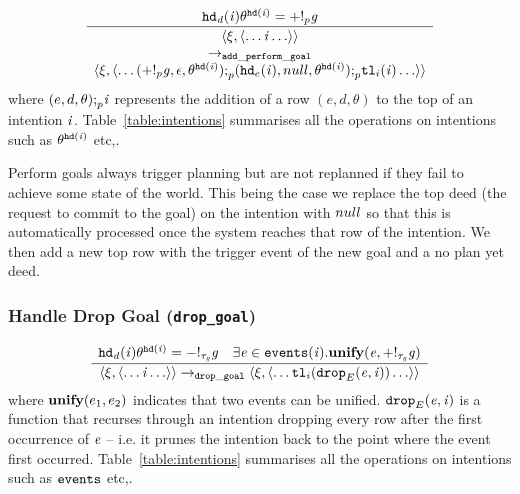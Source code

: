 \begin{equation}\index{goal!perform}
\frac{\INThddeed(\AILintention)\INThdunifier{\AILintention} = +!_{p}\AILgoal
}{
  \begin{array}{c}
\langle \xi, \langle \ldots  \AILintention \ldots \rangle \rangle \\ \rightarrow_{\tt add\_perform\_goal} \\
\langle \xi, \langle \ldots (+!_{p}\AILgoal, \AILnpy, \INThdunifier{\AILintention}) \INTcons (\INThdevent(\AILintention), \AILnullaction,
\INThdunifier{\AILintention}) \INTcons \INTtl(\AILintention) \ldots \rangle \rangle
\end{array}
}
\end{equation}
where $(e, d, \theta) {\tt ;}_p \mathit{i}$ represents the addition of a row $(e, d, \theta)$ to the top of an intention $\mathit{i}$.  Table~\ref{table:intentions} summarises all the operations on intentions such as $\theta^{{\tt hd}(\mathit{i})}$ etc,.

Perform goals always trigger planning but are not replanned if they fail to achieve some state of the world.  This being the case we replace the top deed (the request to commit to the goal) on the intention with $null$ so that this is automatically processed once the system reaches that row of the intention.  We then add a new top row with the trigger event of the new goal and a no plan yet deed.

\subsubsection*{Handle Drop Goal ({\tt drop\_goal})}

\begin{equation}
\frac{
\begin{array}{c}
\mathit{{\tt hd}_d}(\mathit{i})\theta^{{\tt hd}(\mathit{i})} = \mathit{-!}_{\mathit{\tau_{\mathit{g}}}} \mathit{g} \quad
\exists \mathit{e} \in {\tt events}(\mathit{i}). \mbox{{\bf unify}}(\mathit{e}, \mathit{+!}_{\mathit{\tau_{\mathit{g}}}}\mathit{g})
\end{array}
}{\langle \xi, \langle \ldots  \mathit{i} \ldots
\rangle \rangle \rightarrow_{\tt drop\_goal} \langle \xi, \langle \ldots 
{\tt tl}_i({\tt drop}_E(\mathit{e}, \mathit{i})) \ldots \rangle \rangle
}
\end{equation}
where $\mbox{{\bf unify}}(e_1, e_2)$ indicates that two events can be unified.  ${\tt drop}_E(\mathit{e}, \mathit{i})$ is a function that recurses through an intention dropping every row after the first occurrence of $\mathit{e}$ -- i.e. it prunes the intention back to the point where the event first occurred.    Table~\ref{table:intentions} summarises all the operations on intentions such as ${\tt events}$ etc,.

